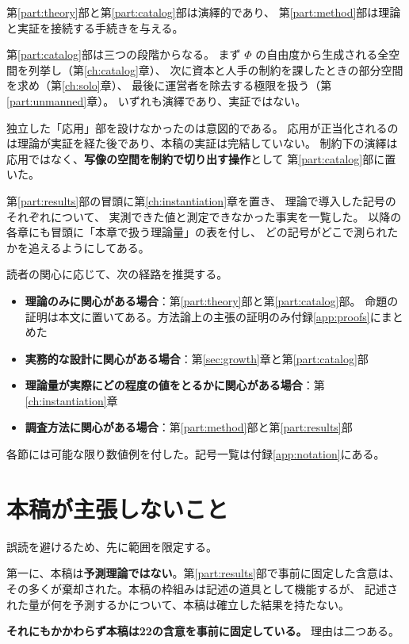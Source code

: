 第\ref{part:theory}部と第\ref{part:catalog}部は演繹的であり、
第\ref{part:method}部は理論と実証を接続する手続きを与える。

第\ref{part:catalog}部は三つの段階からなる。
まず $\Phi$ の自由度から生成される全空間を列挙し（第\ref{ch:catalog}章）、
次に資本と人手の制約を課したときの部分空間を求め（第\ref{ch:solo}章）、
最後に運営者を除去する極限を扱う（第\ref{part:unmanned}章）。
いずれも演繹であり、実証ではない。

独立した「応用」部を設けなかったのは意図的である。
応用が正当化されるのは理論が実証を経た後であり、本稿の実証は完結していない。
制約下の演繹は応用ではなく、\textbf{写像の空間を制約で切り出す操作}として
第\ref{part:catalog}部に置いた。

第\ref{part:results}部の冒頭に第\ref{ch:instantiation}章を置き、
理論で導入した記号のそれぞれについて、
実測できた値と測定できなかった事実を一覧した。
以降の各章にも冒頭に「本章で扱う理論量」の表を付し、
どの記号がどこで測られたかを追えるようにしてある。

読者の関心に応じて、次の経路を推奨する。

\begin{itemize}
\item \textbf{理論のみに関心がある場合}：第\ref{part:theory}部と第\ref{part:catalog}部。
命題の証明は本文に置いてある。方法論上の主張の証明のみ付録\ref{app:proofs}にまとめた
\item \textbf{実務的な設計に関心がある場合}：第\ref{sec:growth}章と第\ref{part:catalog}部
\item \textbf{理論量が実際にどの程度の値をとるかに関心がある場合}：第\ref{ch:instantiation}章
\item \textbf{調査方法に関心がある場合}：第\ref{part:method}部と第\ref{part:results}部
\end{itemize}

各節には可能な限り数値例を付した。記号一覧は付録\ref{app:notation}にある。

\section{本稿が主張しないこと}

誤読を避けるため、先に範囲を限定する。

第一に、本稿は\textbf{予測理論ではない}。第\ref{part:results}部で事前に固定した含意は、
その多くが棄却された。本稿の枠組みは記述の道具として機能するが、
記述された量が何を予測するかについて、本稿は確立した結果を持たない。

\textbf{それにもかかわらず本稿は22の含意を事前に固定している。} 理由は二つある。

